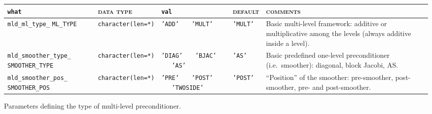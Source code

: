 \bsideways
\begin{center}
\begin{tabular}{|p{5cm}|l|p{2cm}|l|p{7cm}|}
\hline
\verb|what|              & \textsc{data type}        &  \verb|val|      &  \textsc{default}  &
\textsc{comments} \\ \hline
\verb|mld_ml_type_| \break \verb|ML_TYPE|     & \verb|character(len=*)|
                         & \texttt{'ADD'} \ \ \ \texttt{'MULT'}   
                         & \texttt{'MULT'}
                         & Basic multi-level framework: additive or multiplicative
                           among the levels (always additive inside a level).         \\ \hline 
\verb|mld_smoother_type_| \break \verb|SMOOTHER_TYPE|  & \verb|character(len=*)|
                         & \texttt{'DIAG'} \ \ \ \texttt{'BJAC'} \ \ \ \texttt{'AS'}
                         & \texttt{'AS'}
                         & Basic predefined one-level preconditioner
                         (i.e.\ smoother): diagonal, 
                           block Jacobi, AS. \\ \hline
\verb|mld_smoother_pos_| \break \verb|SMOOTHER_POS| & \verb|character(len=*)|
                         & \texttt{'PRE'} \ \ \ \texttt{'POST'} \ \ \ \texttt{'TWOSIDE'}
                         & \texttt{'POST'}
                         & ``Position'' of the smoother: pre-smoother, post-smoother, 
                           pre- and post-smoother. \\
\hline
\end{tabular}
\end{center}
\caption{Parameters defining the type of multi-level preconditioner.
\label{tab:p_type}}                       
\esideways
                   
